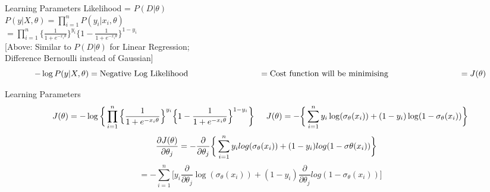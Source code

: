 \documentclass{beamer}
\begin{document}
	\begin{frame}{Learning Parameters}
	    Likelihood = $P(D | \theta)$ \\
	    \vspace{0.2cm}
	    $P(y | X, \theta) = \prod_{i=1}^{n} P(y_{i} | x_{i}, \theta)$ \\
	    \vspace{0.2cm}
	    \hspace{1.55cm} $ = \prod_{i=1}^{n} \Big\{\frac{1}{1 + e^{-x_{i}\theta}}\Big\}^{y_{i}}\Big\{1 - \frac{1}{1 + e^{-x_{i}\theta}}\Big\}^{1 - y_{i}}$ \\
	    \vspace{0.2cm}
	    [Above: Similar to $P(D|\theta)$ for Linear Regression; \\
	    \hspace{1.3cm} Difference Bernoulli instead of Gaussian]\\
	    \begin{equation*}
	        -\log P(y | X, \theta) = \text{Negative Log Likelihood}\\
	        \hspace{3cm} = \text{Cost function will be minimising} \\
	        \hspace{3cm} = J(\theta)
	    \end{equation*}
	\end{frame}
	\begin{frame}{Learning Parameters}
	    \begin{equation*}
	        J(\theta) = -\log \bigg\{\prod_{i=1}^{n} \Big\{\frac{1}{1 + e^{-x_{i}\theta}}\Big\}^{y_{i}}\Big\{1 - \frac{1}{1 + e^{-x_{i}\theta}}\Big\}^{1 - y_{i}}\bigg\}\\
	        \hspace{0.5cm} J(\theta) = -\bigg\{\sum_{i=1}^{n} y_{i} \log(\sigma_{\theta}(x_{i})) + (1 - y_{i})\log(1 - \sigma_{\theta}(x_{i}))\bigg\} \\
	    \end{equation*}
	    \begin{equation*}
	        \hspace{0.5cm} \frac{\partial J(\theta)}{\partial \theta_{j}} = -\frac{\partial }{\partial \theta_{j}} \bigg\{\sum_{i=1}^{n} y_{i} log(\sigma_{\theta}(x_{i})) + (1 - y_{i})log(1 - \sigma{\theta}(x_{i}))\bigg\}
	    \end{equation*}
	    \begin{equation*}
	        = -\sum_{i=1}^{n}\bigg[y_{i}\frac{\partial}{\partial \theta_{j}} \log(\sigma_{\theta}(x_{i})) + (1-y_{i})\frac{\partial}{\partial \theta_{j}} log(1 - \sigma_{\theta}(x_{i}))\bigg]
	    \end{equation*}
	\end{frame}
\end{document}
